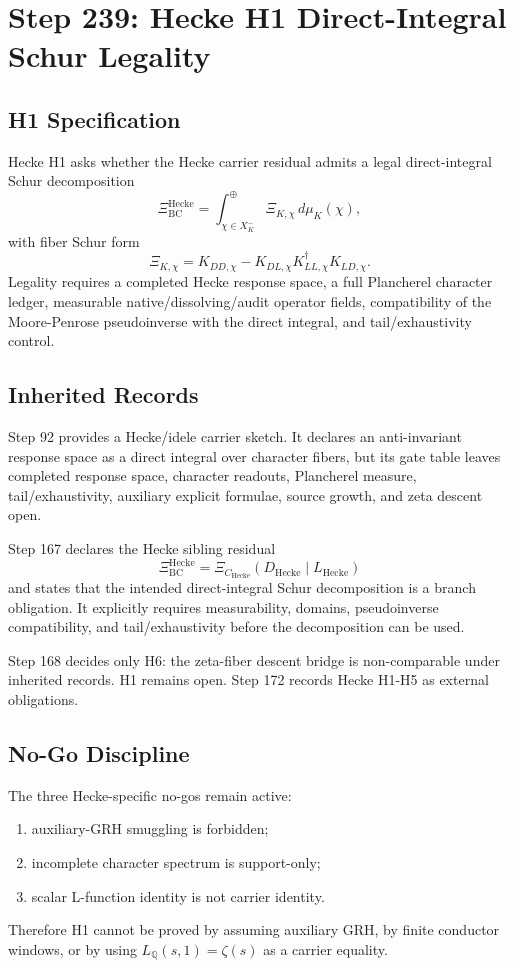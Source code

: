 \section*{Step 239: Hecke H1 Direct-Integral Schur Legality}

\subsection*{H1 Specification}

Hecke H1 asks whether the Hecke carrier residual admits a legal direct-integral Schur decomposition
\[
\Xi^{\mathrm{Hecke}}_{\mathrm{BC}}
  = \int_{\chi\in X_K^-}^{\oplus} \Xi_{K,\chi}\,d\mu_K(\chi),
\]
with fiber Schur form
\[
\Xi_{K,\chi}
  = K_{DD,\chi}
    - K_{DL,\chi} K_{LL,\chi}^{\dagger} K_{LD,\chi}.
\]
Legality requires a completed Hecke response space, a full Plancherel character ledger, measurable native/dissolving/audit operator fields, compatibility of the Moore-Penrose pseudoinverse with the direct integral, and tail/exhaustivity control.

\subsection*{Inherited Records}

Step 92 provides a Hecke/idele carrier sketch. It declares an anti-invariant response space as a direct integral over character fibers, but its gate table leaves completed response space, character readouts, Plancherel measure, tail/exhaustivity, auxiliary explicit formulae, source growth, and zeta descent open.

Step 167 declares the Hecke sibling residual
\[
\Xi^{\mathrm{Hecke}}_{\mathrm{BC}}
  = \Xi_{C_{\mathrm{Hecke}}}(D_{\mathrm{Hecke}}\mid L_{\mathrm{Hecke}})
\]
and states that the intended direct-integral Schur decomposition is a branch obligation. It explicitly requires measurability, domains, pseudoinverse compatibility, and tail/exhaustivity before the decomposition can be used.

Step 168 decides only H6: the zeta-fiber descent bridge is non-comparable under inherited records. H1 remains open. Step 172 records Hecke H1-H5 as external obligations.

\subsection*{No-Go Discipline}

The three Hecke-specific no-gos remain active:
\begin{enumerate}
  \item auxiliary-GRH smuggling is forbidden;
  \item incomplete character spectrum is support-only;
  \item scalar L-function identity is not carrier identity.
\end{enumerate}
Therefore H1 cannot be proved by assuming auxiliary GRH, by finite conductor windows, or by using $L_{\mathbb Q}(s,1)=\zeta(s)$ as a carrier equality.

